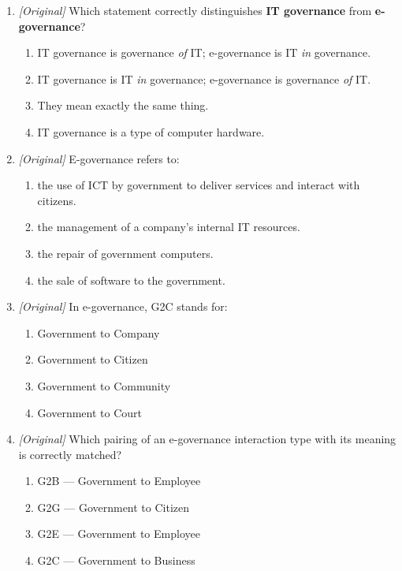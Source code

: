 \documentclass[11pt]{article}
\begin{document}
\begin{enumerate}[label=\textbf{Q\arabic*.}, leftmargin=*]
\begin{enumerate}[label=\Alph*.]
    \item Humanware
    \item Firmware
  \end{enumerate}
\item \textit{[Original]} Which statement correctly distinguishes
  \textbf{IT governance} from \textbf{e-governance}?
  \begin{enumerate}[label=\Alph*.]
    \item IT governance is governance \emph{of} IT; e-governance is IT
      \emph{in} governance.
    \item IT governance is IT \emph{in} governance; e-governance is
      governance \emph{of} IT.
    \item They mean exactly the same thing.
    \item IT governance is a type of computer hardware.
  \end{enumerate}
\item \textit{[Original]} E-governance refers to:
  \begin{enumerate}[label=\Alph*.]
    \item the use of ICT by government to deliver services and interact with
      citizens.
    \item the management of a company's internal IT resources.
    \item the repair of government computers.
    \item the sale of software to the government.
  \end{enumerate}
\item \textit{[Original]} In e-governance, G2C stands for:
  \begin{enumerate}[label=\Alph*.]
    \item Government to Company
    \item Government to Citizen
    \item Government to Community
    \item Government to Court
  \end{enumerate}
\item \textit{[Original]} Which pairing of an e-governance interaction type
  with its meaning is correctly matched?
  \begin{enumerate}[label=\Alph*.]
    \item G2B --- Government to Employee
    \item G2G --- Government to Citizen
    \item G2E --- Government to Employee
    \item G2C --- Government to Business

\end{enumerate}
\end{enumerate}
\end{document}
